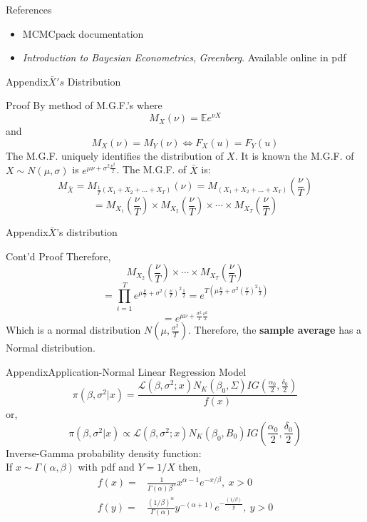 \documentclass[table]{beamer}
\begin{document}
\begin{frame}{References}
	\begin{itemize}
		\item MCMCpack documentation
		\item \textit{Introduction to Bayesian Econometrics}, \textit{Greenberg}. Available online in pdf
	\end{itemize}
\end{frame}
	

\begin{frame}{Appendix}{$ \bar{X}'s$ Distribution }
	\begin{block}{Proof}
		By method of M.G.F.'s where
		$$ M_X(\nu) = \mathbb{E}e^{\nu X}  $$ and \[ M_X(\nu) = M_Y(\nu) \iff F_X(u) = F_Y(u) \] 
		The M.G.F. uniquely identifies the distribution of $ X $. It is known the M.G.F. of $ X \sim N(\mu,\sigma) $ is $ e^{\mu\nu +  \sigma^2\frac{\nu^2}{2}} $. The M.G.F. of $ \bar{X} $ is:
		\[ M_{\bar{X}} = M_{\frac{1}{T}(X_1 + X_2 + \dots + X_T)}(\nu) = M_{(X_1 + X_2 + \dots + X_T)}(\frac{\nu}{T}) \]
		\[ = M_{X_1}(\frac{\nu}{T}) \times  M_{X_2}(\frac{\nu}{T})\times\cdots\times M_{X_T}(\frac{\nu}{T}) \]
	\end{block}
\end{frame}

\begin{frame}{Appendix}{$ \bar{X} $'s distribution}
	\begin{block}{Cont'd Proof}
		Therefore, 
		\[ M_{X_2}(\frac{\nu}{T})\times\cdots\times M_{X_T}(\frac{\nu}{T}) \]
		\[ =  \prod_{i=1}^{T} e^{\mu \frac{\nu}{T} +  \sigma^2 (\frac{\nu}{T})^2 \frac{1}{2}} = e^{T(\mu \frac{\nu}{T} +  \sigma^2 (\frac{\nu}{T})^2 \frac{1}{2})}\]
		\[ =  e^{\mu\nu +  \frac{\sigma^2}{T} \frac{\nu^2}{2}} \]
		Which is a normal distribution $ N(\mu, \frac{\sigma^2}{T}).  $
		Therefore, the \textbf{sample average} has a Normal distribution. 
	\end{block}
\end{frame}

\begin{frame}{Appendix}{Application-Normal Linear Regression Model}
	\[ \pi(\beta, \sigma^2 | x) = \frac{  \mathscr{L}(\beta, \sigma^2;x) N_K(\beta_0, \Sigma) IG(\frac{ \alpha_0 }{2}, \frac{ \delta_0 }{2}  ) }{ f(x) } \]
	or, 
	\[ \pi(\beta, \sigma^2 | x) \propto  \mathscr{L}(\beta, \sigma^2;x) N_K(\beta_0, B_0) IG(\frac{ \alpha_0 }{2}, \frac{ \delta_0 }{2}  )  \]
	Inverse-Gamma probability density function:\\
	If $ x \sim \Gamma(\alpha, \beta) $ with pdf and $ Y = 1/X $ then,
	\begin{align*}
	f(x) = &  \frac{1}{ \Gamma(\alpha)\beta^{\alpha} } x^{\alpha-1} e^{-x/\beta}, \  x > 0 \\
	f(y) = & \frac{ (1/\beta)^{\alpha} }{\Gamma(\alpha) } y^{-(\alpha + 1) } e^{-\frac{ (1/\beta) }{ y }}, \ y>0 
	\end{align*}
\end{frame}
\end{document}
